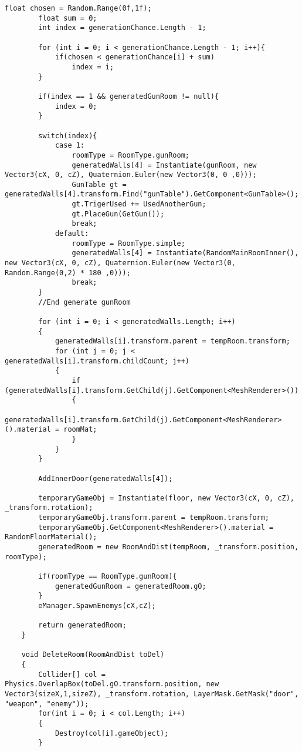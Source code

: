 \documentclass[14pt, titlepage,fleqn,a4paper]{extarticle}
\begin{document}
\begin{lstlisting}[caption= Генератор карты, label=lst:test]
        float chosen = Random.Range(0f,1f);
        float sum = 0;
        int index = generationChance.Length - 1;

        for (int i = 0; i < generationChance.Length - 1; i++){
            if(chosen < generationChance[i] + sum)
                index = i;
        }

        if(index == 1 && generatedGunRoom != null){
            index = 0;
        }

        switch(index){
            case 1:
                roomType = RoomType.gunRoom;
                generatedWalls[4] = Instantiate(gunRoom, new Vector3(cX, 0, cZ), Quaternion.Euler(new Vector3(0, 0 ,0)));
                GunTable gt =  generatedWalls[4].transform.Find("gunTable").GetComponent<GunTable>();
                gt.TrigerUsed += UsedAnotherGun;
                gt.PlaceGun(GetGun());
                break;
            default:
                roomType = RoomType.simple;
                generatedWalls[4] = Instantiate(RandomMainRoomInner(), new Vector3(cX, 0, cZ), Quaternion.Euler(new Vector3(0, Random.Range(0,2) * 180 ,0)));
                break;
        }
        //End generate gunRoom

        for (int i = 0; i < generatedWalls.Length; i++)
        {
            generatedWalls[i].transform.parent = tempRoom.transform;
            for (int j = 0; j < generatedWalls[i].transform.childCount; j++)
            {
                if (generatedWalls[i].transform.GetChild(j).GetComponent<MeshRenderer>())
                {
                    generatedWalls[i].transform.GetChild(j).GetComponent<MeshRenderer>().material = roomMat;
                }
            }
        }

        AddInnerDoor(generatedWalls[4]);

        temporaryGameObj = Instantiate(floor, new Vector3(cX, 0, cZ), _transform.rotation);
        temporaryGameObj.transform.parent = tempRoom.transform;
        temporaryGameObj.GetComponent<MeshRenderer>().material = RandomFloorMaterial();
        generatedRoom = new RoomAndDist(tempRoom, _transform.position, roomType);
        
        if(roomType == RoomType.gunRoom){
            generatedGunRoom = generatedRoom.gO;
        }
        eManager.SpawnEnemys(cX,cZ);
        
        return generatedRoom;
    }

    void DeleteRoom(RoomAndDist toDel)
    {
        Collider[] col = Physics.OverlapBox(toDel.gO.transform.position, new Vector3(sizeX,1,sizeZ), _transform.rotation, LayerMask.GetMask("door", "weapon", "enemy"));
        for(int i = 0; i < col.Length; i++)
        {
            Destroy(col[i].gameObject);
        }


\end{lstlisting}
\end{document}
